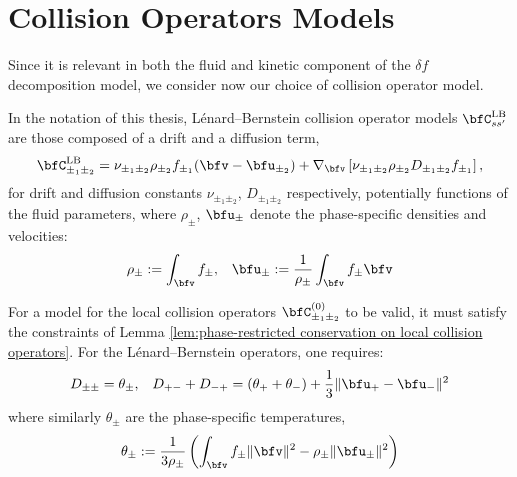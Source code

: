 \section{Collision Operators Models}\label{cha:collision operators}
    Since it is relevant in both the fluid and kinetic component of the $\delta\!f$ decomposition model, we consider now our choice of collision operator model.

    \line

    \begin{definition}
        In the notation of this thesis, Lénard--Bernstein collision operator models $\bfC_{ss'}^{\rm LB}$ are those composed of a drift and a diffusion term,
        \begin{equation}\label{eqn:Lénard--Bernstein operator}
            \bfC_{\pm_{1}\pm_{2}}^{\rm LB}  =  \nu_{\pm_{1}\pm_{2}}\rho_{\pm_{2}}f_{\pm_{1}}(\bfv - \bfu_{\pm_{2}}) + \nabla_{\bfv}\left[\nu_{\pm_{1}\pm_{2}}\rho_{\pm_{2}}D_{\pm_{1}\pm_{2}}f_{\pm_{1}}\right],
        \end{equation}
        for drift and diffusion constants $\nu_{\pm_{1}\pm_{2}}$, $D_{\pm_{1}\pm_{2}}$ respectively, potentially functions of the fluid parameters, where $\rho_{\pm}$, $\bfu_{\pm}$ denote the phase-specific densities and velocities:
        \begin{align}
            \rho_{\pm}  :=                      \int_{\bfv}f_{\pm},  &&
            \bfu_{\pm}  :=  \frac{1}{\rho_{\pm}}\int_{\bfv}f_{\pm}\bfv
        \end{align}
    \end{definition}

    \line

    For a model for the local collision operators $\bfC_{\pm_{1}\pm_{2}}^{(0)}$ to be valid, it must satisfy the constraints of Lemma \ref{lem:phase-restricted conservation on local collision operators}. For the Lénard--Bernstein operators, one requires:
    \begin{align}
             D_{\pm\pm}  =  \theta_{\pm},  &&
        D_{+-} + D_{-+}  =  (\theta_{+} + \theta_{-}) + \frac{1}{3}\|\bfu_{+} - \bfu_{-}\|^{2}
    \end{align}
    where similarly $\theta_{\pm}$ are the phase-specific temperatures,
    \begin{equation}
        \theta_{\pm}  :=  \frac{1}{3\rho_{\pm}}\left(\int_{\bfv}f_{\pm}\|\bfv\|^{2} - \rho_{\pm}\|\bfu_{\pm}\|^{2}\right)
    \end{equation}

